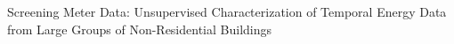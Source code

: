 
Screening Meter Data: Unsupervised Characterization of Temporal Energy Data from Large Groups of Non-Residential Buildings